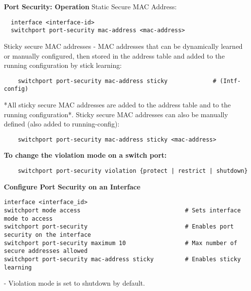 \documentclass[../EngineeringJournal_CDavis.tex]{subfiles}
\begin{document}
\hspace{0.2cm}
\begin{tcolorbox}[width=6.3in]
  {\bf{Port Security: Operation}}
  Static Secure MAC Address:
\scriptsize
  \begin{verbatim}
  interface <interface-id>
  switchport port-security mac-address <mac-address>
  \end{verbatim}
\normalsize
Sticky secure MAC addresses - MAC addresses that can be dynamically learned or manually configured, then stored in the address table and added to the running configuration by stick learning:
\scriptsize
  \begin{verbatim}
    switchport port-security mac-address sticky             # (Intf-config)
  \end{verbatim}
  \begin{outline}
    \1 *All sticky secure MAC addresses are added to the address table and to the running configuration*.
    \1 Sticky secure MAC addresses can also be manually defined (also added to running-config):
  \end{outline}
  \begin{verbatim}
    switchport port-security mac-address sticky <mac-address>
  \end{verbatim}
\end{tcolorbox}
\hspace{0.2cm}
\normalsize  




\hspace{0.2cm}
\begin{tcolorbox}[width=6.3in]
\scriptsize 
{\bf{ To change the violation mode on a switch port: }}
  \begin{verbatim}
    switchport port-security violation {protect | restrict | shutdown}
  \end{verbatim}
\end{tcolorbox}
\hspace{0.2cm}
\normalsize  





\hspace{0.2cm}
\begin{tcolorbox}[width=6.3in]
{\bf{Configure Port Security on an Interface}}
\scriptsize 
\begin{verbatim}
interface <interface_id>
switchport mode access                              # Sets interface mode to access
switchport port-security                            # Enables port security on the interface
switchport port-security maximum 10                 # Max number of secure addresses allowed
switchport port-security mac-address sticky         # Enables sticky learning
\end{verbatim}
\normalsize  
- Violation mode is set to shutdown by default.
\end{tcolorbox}
\hspace{0.2cm}
\end{document}
